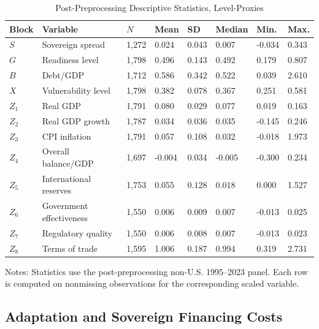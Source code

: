 \begin{table}[H]\centering
\begin{threeparttable}
\caption{Post-Preprocessing Descriptive Statistics, Level-Proxies}
\label{tab:appc_summary_stats}
\scriptsize
\setlength{\tabcolsep}{2.6pt}
\begin{tabularx}{\textwidth}{llYYYYYY}
\toprule
Block & Variable & $N$ & Mean & SD & Median & Min. & Max. \\
\midrule
$S$ & Sovereign spread & 1,272 & 0.024 & 0.043 & 0.007 & -0.034 & 0.343 \\
$G$ & Readiness level & 1,798 & 0.496 & 0.143 & 0.492 & 0.179 & 0.807 \\
$B$ & Debt/GDP & 1,712 & 0.586 & 0.342 & 0.522 & 0.039 & 2.610 \\
$X$ & Vulnerability level & 1,798 & 0.382 & 0.078 & 0.367 & 0.251 & 0.581 \\
$Z_1$ & Real GDP & 1,791 & 0.080 & 0.029 & 0.077 & 0.019 & 0.163 \\
$Z_2$ & Real GDP growth & 1,787 & 0.034 & 0.036 & 0.035 & -0.145 & 0.246 \\
$Z_3$ & CPI inflation & 1,791 & 0.057 & 0.108 & 0.032 & -0.018 & 1.973 \\
$Z_4$ & Overall balance/GDP & 1,697 & -0.004 & 0.034 & -0.005 & -0.300 & 0.234 \\
$Z_5$ & International reserves & 1,753 & 0.055 & 0.128 & 0.018 & 0.000 & 1.527 \\
$Z_6$ & Government effectiveness & 1,550 & 0.006 & 0.009 & 0.007 & -0.013 & 0.025 \\
$Z_7$ & Regulatory quality & 1,550 & 0.006 & 0.008 & 0.007 & -0.013 & 0.023 \\
$Z_8$ & Terms of trade & 1,595 & 1.006 & 0.187 & 0.994 & 0.319 & 2.731 \\
\bottomrule
\end{tabularx}
\begin{tablenotes}[flushleft]\footnotesize
\item Notes: Statistics use the post-preprocessing non-U.S. 1995--2023 panel. Each row is computed on nonmissing observations for the corresponding scaled variable.
\end{tablenotes}
\end{threeparttable}
\end{table}

\subsection{Adaptation and Sovereign Financing Costs}

